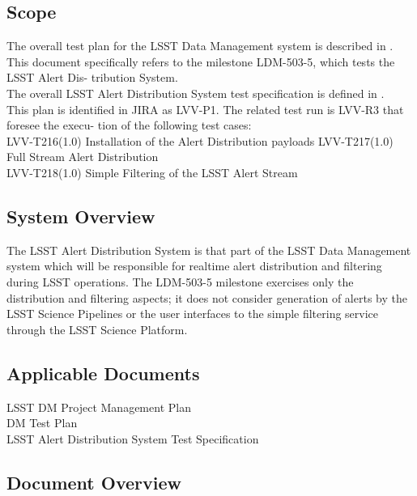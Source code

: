 \documentclass[DM,lsstdraft,STR,toc]{lsstdoc}
\begin{document}
\subsection{Scope}\label{scope}

The overall test plan for the LSST Data Management system is described
in .\\
This document specifically refers to the milestone LDM-503-5, which
tests the LSST Alert Dis- tribution System.\\
The overall LSST Alert Distribution System test specification is defined
in .\\[2\baselineskip]This plan is identified in JIRA as LVV-P1.
The related test run is LVV-R3 that foresee the execu- tion of the
following test cases:\\
LVV-T216(1.0) Installation of the Alert Distribution payloads
LVV-T217(1.0) Full Stream Alert Distribution\\
LVV-T218(1.0) Simple Filtering of the LSST Alert
Stream\\[3\baselineskip]



\subsection{System Overview}
\label{sect:systemoverview}

The LSST Alert Distribution System is that part of the LSST Data
Management system which will be responsible for realtime alert
distribution and filtering during LSST operations. The LDM-503-5
milestone exercises only the distribution and filtering aspects; it does
not consider generation of alerts by the LSST Science Pipelines or the
user interfaces to the simple filtering service through the LSST Science
Platform.\\[2\baselineskip]

\subsection{Applicable Documents}\label{applicable-documents}

 LSST DM Project Management Plan\\
 DM Test Plan\\
 LSST Alert Distribution System Test Specification


\subsection{Document Overview}
\label{sect:docoverview}
\end{document}
